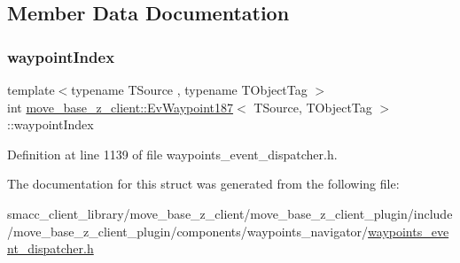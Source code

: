 \subsection{Member Data Documentation}
\mbox{\label{structmove__base__z__client_1_1EvWaypoint187_a122d54e82e47ee30b056ffa30551b14b}} 
\subsubsection{\texorpdfstring{waypoint\+Index}{waypointIndex}}
{\footnotesize\ttfamily template$<$typename T\+Source , typename T\+Object\+Tag $>$ \\
int \hyperlink{structmove__base__z__client_1_1EvWaypoint187}{move\+\_\+base\+\_\+z\+\_\+client\+::\+Ev\+Waypoint187}$<$ T\+Source, T\+Object\+Tag $>$\+::waypoint\+Index}



Definition at line 1139 of file waypoints\+\_\+event\+\_\+dispatcher.\+h.



The documentation for this struct was generated from the following file\+:\begin{DoxyCompactItemize}
\item 
smacc\+\_\+client\+\_\+library/move\+\_\+base\+\_\+z\+\_\+client/move\+\_\+base\+\_\+z\+\_\+client\+\_\+plugin/include/move\+\_\+base\+\_\+z\+\_\+client\+\_\+plugin/components/waypoints\+\_\+navigator/\hyperlink{waypoints__event__dispatcher_8h}{waypoints\+\_\+event\+\_\+dispatcher.\+h}\end{DoxyCompactItemize}
